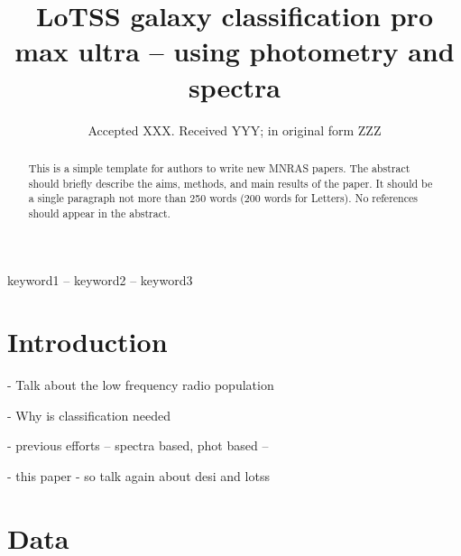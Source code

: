\documentclass[fleqn,usenatbib]{mnras}
\title[LoTSS galaxy classification with spectra]{LoTSS galaxy classification pro max ultra -- using photometry and spectra}
\date{Accepted XXX. Received YYY; in original form ZZZ}
\begin{document}
\label{firstpage}
\pagerange{\pageref{firstpage}--\pageref{lastpage}}
\maketitle

\begin{abstract}
This is a simple template for authors to write new MNRAS papers.
The abstract should briefly describe the aims, methods, and main results of the paper.
It should be a single paragraph not more than 250 words (200 words for Letters).
No references should appear in the abstract.
\end{abstract}

\begin{keywords}
keyword1 -- keyword2 -- keyword3
\end{keywords}



\section{Introduction}
- Talk about the low frequency radio population

- Why is classification needed

- previous efforts -- spectra based, phot based -- 

- this paper -  so talk again about desi and lotss


\section{Data}
\end{document}

